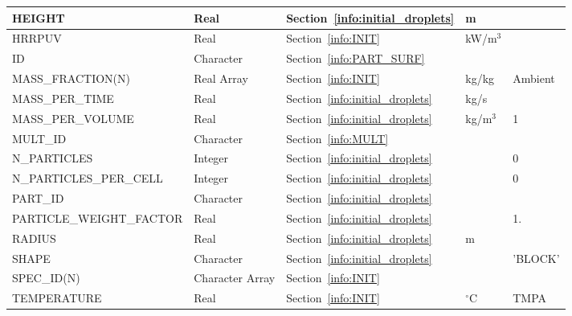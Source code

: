 \documentclass[11pt]{book}
\begin{document}
\begin{longtable}{@{\extracolsep{\fill}}|l|l|l|l|l|}
{\ct HEIGHT}                    & Real              & Section~\ref{info:initial_droplets}           & m             &               \\ \hline
{\ct HRRPUV}                    & Real              & Section~\ref{info:INIT}                       & kW/m$^3$      &               \\ \hline
{\ct ID}                        & Character         & Section~\ref{info:PART_SURF}                  &               &               \\ \hline
{\ct MASS\_FRACTION(N)}         & Real Array        & Section~\ref{info:INIT}                       & kg/kg         & Ambient       \\ \hline
{\ct MASS\_PER\_TIME}           & Real              & Section~\ref{info:initial_droplets}           & kg/s          &               \\ \hline
{\ct MASS\_PER\_VOLUME}         & Real              & Section~\ref{info:initial_droplets}           & kg/m$^3$      & 1             \\ \hline
{\ct MULT\_ID }                 & Character         & Section~\ref{info:MULT}                       &               &               \\ \hline
{\ct N\_PARTICLES}              & Integer           & Section~\ref{info:initial_droplets}           &               & 0             \\ \hline
{\ct N\_PARTICLES\_PER\_CELL}   & Integer           & Section~\ref{info:initial_droplets}           &               & 0             \\ \hline
{\ct PART\_ID}                  & Character         & Section~\ref{info:initial_droplets}           &               &               \\ \hline
{\ct PARTICLE\_WEIGHT\_FACTOR}  & Real              & Section~\ref{info:initial_droplets}           &               & 1.            \\ \hline
{\ct RADIUS}                    & Real              & Section~\ref{info:initial_droplets}           & m             &               \\ \hline
{\ct SHAPE}                     & Character         & Section~\ref{info:initial_droplets}           &               & {\ct 'BLOCK'} \\ \hline
{\ct SPEC\_ID(N)}               & Character Array   & Section~\ref{info:INIT}                       &               &               \\ \hline
{\ct TEMPERATURE}               & Real              & Section~\ref{info:INIT}                       & $^\circ$C     & {\ct TMPA}    \\ \hline

\end{longtable}
\end{document}
